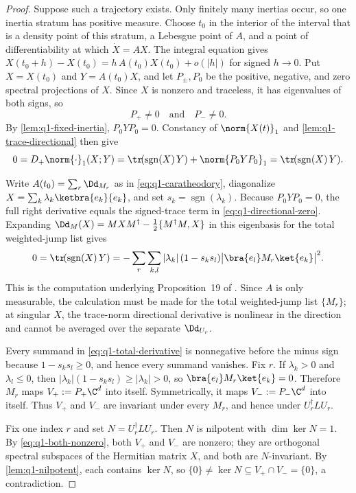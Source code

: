 \documentclass[class=article,11pt,a4paper,crop=false]{standalone}
\begin{document}
\begin{proof}
	Suppose such a trajectory exists. Only finitely many inertias occur, so one
	inertia stratum has positive measure. Choose $t_0$ in the interior of the
	interval that is a density point of this stratum, a Lebesgue point of $A$,
	and a point of differentiability at which $\dot X=AX$. The integral equation
	gives
	$X(t_0+h)-X(t_0)=h\,A(t_0)X(t_0)+o(|h|)$ for signed $h\to0$. Put
	$X=X(t_0)$ and $Y=A(t_0)X$, and let $P_\pm,P_0$ be the positive, negative,
	and zero spectral projections of $X$. Since $X$ is nonzero and traceless, it
	has eigenvalues of both signs, so
	\begin{equation}
		P_+\ne0\quad\text{and}\quad P_-\ne0.
		\label{eq:q1-both-nonzero}
	\end{equation}
	By \cref{lem:q1-fixed-inertia}, $P_0YP_0=0$. Constancy of
	$\norm{X(t)}_1$ and \cref{lem:q1-trace-directional} then give
	\begin{equation}
		0=D_+\norm{\cdot}_1(X;Y)
		=\tr\!(\operatorname{sgn}(X)\,Y)+\norm{P_0YP_0}_1
		=\tr\!(\operatorname{sgn}(X)\,Y).
		\label{eq:q1-directional-zero}
	\end{equation}

	Write $A(t_0)=\sum_r\Dd_{M_r}$ as in \eqref{eq:q1-caratheodory},
	diagonalize
	$X=\sum_k\lambda_k\ketbra{e_k}{e_k}$, and set
	$s_k=\operatorname{sgn}(\lambda_k)$. Because $P_0YP_0=0$, the full right
	derivative equals the signed-trace term in \eqref{eq:q1-directional-zero}.
	Expanding $\Dd_M(X)=MXM^\dagger-\tfrac12\{M^\dagger M,X\}$ in this
	eigenbasis for the total weighted-jump list gives
	\begin{equation}
		0=\tr\!(\operatorname{sgn}(X)\,Y)
		=-\sum_{r}\sum_{k,l}|\lambda_k|\,(1-s_ks_l)
		\big|\bra{e_l}M_r\ket{e_k}\big|^2.
		\label{eq:q1-total-derivative}
	\end{equation}
	This is the computation underlying Proposition~19 of
	\cite{Wolff2026Contractivity}. Since $A$ is only measurable, the calculation
	must be made for the total weighted-jump list $\{M_r\}$; at singular $X$, the
	trace-norm directional derivative is nonlinear in the direction and cannot
	be averaged over the separate $\Dd_{U_r}$.

	Every summand in \eqref{eq:q1-total-derivative} is nonnegative before the
	minus sign because $1-s_ks_l\ge0$, and hence every summand vanishes. Fix
	$r$. If $\lambda_k>0$ and $\lambda_l\le0$, then
	$|\lambda_k|(1-s_ks_l)\ge|\lambda_k|>0$, so
	$\bra{e_l}M_r\ket{e_k}=0$. Therefore $M_r$ maps
	$V_+:=P_+\C^d$ into itself. Symmetrically, it maps
	$V_-:=P_-\C^d$ into itself. Thus $V_+$ and $V_-$ are invariant under every
	$M_r$, and hence under $U_r^\dagger LU_r$.

	Fix one index $r$ and set $N=U_r^\dagger LU_r$. Then $N$ is nilpotent with
	$\dim\ker N=1$. By \eqref{eq:q1-both-nonzero}, both $V_+$ and $V_-$ are
	nonzero; they are orthogonal spectral subspaces of the Hermitian matrix $X$,
	and both are $N$-invariant. By \cref{lem:q1-nilpotent}, each contains
	$\ker N$, so
	$\{0\}\ne\ker N\subseteq V_+\cap V_-=\{0\}$, a contradiction.
\end{proof}
\end{document}
